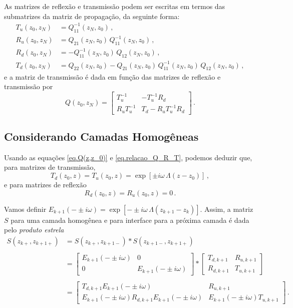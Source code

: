 As matrizes de reflex\~ao e transmiss\~ao podem ser escritas em termos das submatrizes da matriz de propaga\c{c}\~ao, da seguinte forma:
\begin{align}\nonumber
T_u(z_0,z_N)&=Q_{11}^{-1}(z_N,z_0)\,,\\\nonumber
R_u(z_0,z_N)&=Q_{21}(z_N,z_0)\,Q_{11}^{-1}(z_N,z_0)\,,\\\label{eq.relacao_Q_R_T}
R_d(z_0,z_N)&=-Q_{11}^{-1}(z_N,z_0)\,Q_{12}(z_N,z_0)\,,\\\nonumber
T_d(z_0,z_N)&=Q_{22}(z_N,z_0)-Q_{21}(z_N,z_0)\,Q_{11}^{-1}(z_N,z_0)\,Q_{12}(z_N,z_0)\,,
\end{align}
e a matriz de transmiss\~ao \'e dada em fun\c{c}\~ao das matrizes de reflex\~ao e transmiss\~ao por
\begin{equation*}
Q(z_0,z_N)=
\begin{bmatrix}
T_u^{-1}&-T_u^{-1}R_d\\
R_uT_u^{-1}&T_d-R_uT_u^{-1}R_d
\end{bmatrix}\,.
\end{equation*}

\subsection{Considerando Camadas Homog\^eneas}

Usando as equa\c{c}\~oes \ref{eq.Q(z,z_0)} e \ref{eq.relacao_Q_R_T}, podemos deduzir que, para matrizes de transmiss\~ao,
\begin{equation*}
T_d(z_0,z)=T_u(z_0,z)=\exp\left[\pm i\omega\,\Lambda(z-z_0)\right]\,,
\end{equation*}
e para matrizes de reflex\~ao
\begin{equation*}
R_d(z_0,z)=R_u(z_0,z)=0\,.
\end{equation*}

Vamos definir $E_{k+1}(-\pm i\omega)=\exp\left[-\pm i\omega\,\Lambda(z_{k+1}-z_k)\right]$. Assim, a matriz $S$ para uma camada homog\^enea e para interface para a pr\'oxima camada \'e dada pelo \textit{produto estrela} 
\begin{align*}
S(z_{k+},z_{k+1+})&=S(z_{k+},z_{k+1-})*S(z_{k+1-},z_{k+1+})\\\\
&=
\begin{bmatrix}
E_{k+1}(-\pm i\omega)&0\\
0&E_{k+1}(-\pm i\omega)
\end{bmatrix}
*
\begin{bmatrix}
T_{d,k+1}&R_{u,k+1}\\
R_{d,k+1}&T_{u,k+1}
\end{bmatrix}\\\\
&=
\begin{bmatrix}
T_{d,k+1}E_{k+1}(-\pm i\omega)&R_{u,k+1}\\
E_{k+1}(-\pm i\omega)R_{d,k+1}E_{k+1}(-\pm i\omega)&E_{k+1}(-\pm i\omega)T_{u,k+1}
\end{bmatrix}\,.
\end{align*}